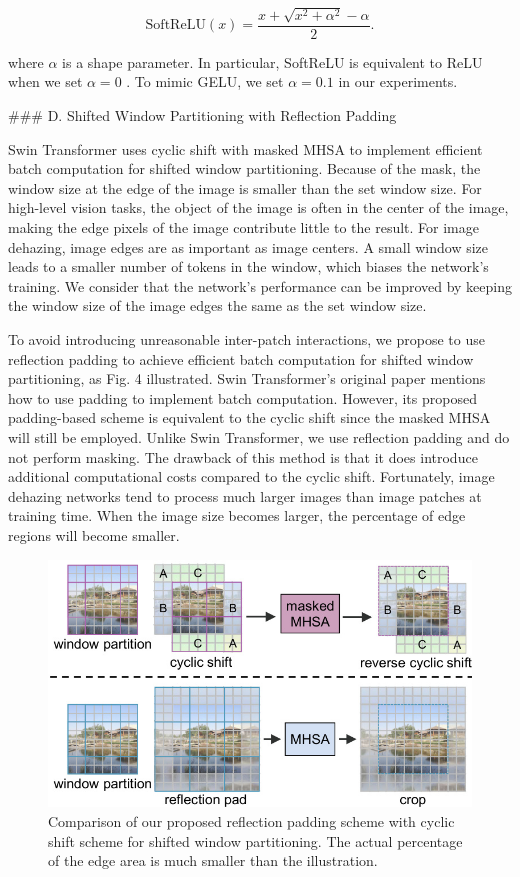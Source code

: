 \begin{equation}
\mathrm{SoftReLU}(x)=\frac{x+\sqrt{x^{2}+\alpha^{2}}-\alpha}{2}.
\end{equation}

where $\alpha$ is a shape parameter. In particular, SoftReLU is equivalent to ReLU when we set $\alpha=0$ . To mimic GELU, we set $\alpha=0.1$ in our experiments.

\#\#\# D. Shifted Window Partitioning with Reflection Padding

Swin Transformer uses cyclic shift with masked MHSA to implement efficient batch computation for shifted window partitioning. Because of the mask, the window size at the edge of the image is smaller than the set window size. For high-level vision tasks, the object of the image is often in the center of the image, making the edge pixels of the image contribute little to the result. For image dehazing, image edges are as important as image centers. A small window size leads to a smaller number of tokens in the window, which biases the network’s training. We consider that the network’s performance can be improved by keeping the window size of the image edges the same as the set window size.

To avoid introducing unreasonable inter-patch interactions, we propose to use reflection padding to achieve efficient batch computation for shifted window partitioning, as Fig. 4 illustrated. Swin Transformer’s original paper mentions how to use padding to implement batch computation. However, its proposed padding-based scheme is equivalent to the cyclic shift since the masked MHSA will still be employed. Unlike Swin Transformer, we use reflection padding and do not perform masking. The drawback of this method is that it does introduce additional computational costs compared to the cyclic shift. Fortunately, image dehazing networks tend to process much larger images than image patches at training time. When the image size becomes larger, the percentage of edge regions will become smaller.

\begin{figure}[htbp]
\centering
\includegraphics[width=0.8\linewidth]{images/1c19269dfd95d853b63305ce6cdb8ea0ac4998ae68e204ab70571b32a95204cd.jpg}
\caption{Comparison of our proposed reflection padding scheme with cyclic shift scheme for shifted window partitioning. The actual percentage of the edge area is much smaller than the illustration.}
\label{fig:5}
\end{figure}


